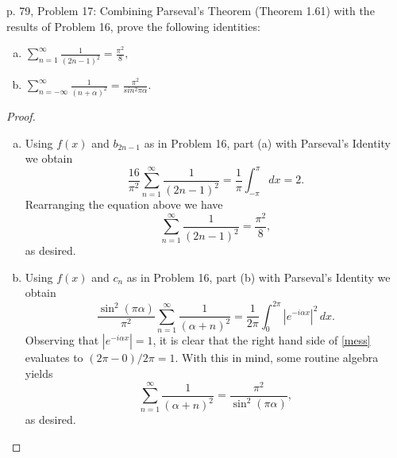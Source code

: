 \documentclass[10pt]{amsart}
\begin{document}
\begin{thm}{p. 79, Problem 17:}
  Combining Parseval's Theorem (Theorem 1.61) with the results of Problem 16, prove the following identities:
    \begin{enumerate}[(a)]
    \item
      $\displaystyle{\sum_{n=1}^{\infty} \frac{1}{(2n-1)^2} = \frac{\pi^2}{8}},$
    \item
      $\displaystyle{\sum_{n=-\infty}^{\infty} \frac{1}{(n+\alpha)^2} = \frac{\pi^2}{sin^2{\pi\alpha}}}.$
    \end{enumerate}
  \begin{proof}
    \begin{enumerate}[(a)]
      \item
        Using $f(x)$ and $b_{2n-1}$ as in Problem 16, part (a) with Parseval's Identity we obtain 
        $$\frac{16}{\pi^2} \sum_{n=1}^{\infty}\frac{1}{(2n-1)^2} = \frac{1}{\pi} \int_{-\pi}^{\pi}dx = 2.$$
        Rearranging the equation above we have 
        $$\sum_{n=1}^{\infty}\frac{1}{(2n-1)^2} = \frac{\pi^2}{8},$$
        as desired.
      \item
        Using $f(x)$ and $c_{n}$ as in Problem 16, part (b) with Parseval's Identity we obtain 
        \begin{equation}\label{mess}
          \frac{\sin^2(\pi\alpha)}{\pi^2} \sum_{n=1}^{\infty}\frac{1}{(\alpha+n)^2} = \frac{1}{2\pi} \int_{0}^{2\pi} \left|e^{-i\alpha x}\right|^2\,dx.
        \end{equation}
        Observing that $\left|e^{-i\alpha x}\right| = 1$, it is clear that the right hand side of \eqref{mess} evaluates to $(2\pi - 0)/2\pi = 1$.
        With this in mind, some routine algebra yields $$\sum_{n=1}^{\infty}\frac{1}{(\alpha+n)^2} = \frac{\pi^2}{\sin^2(\pi\alpha)},$$ as desired.
    \end{enumerate}
  \end{proof}
\end{thm}
\end{document}
